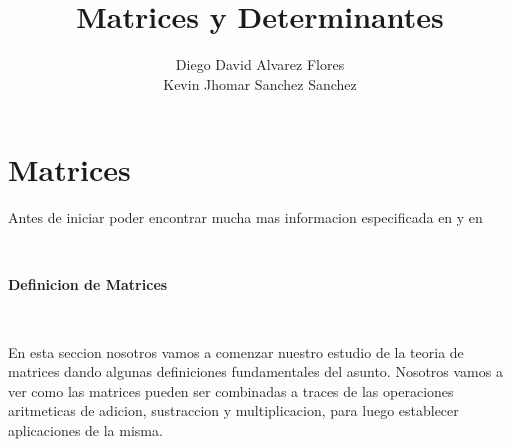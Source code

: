 \documentclass[11pt, conference]{IEEEtran}
\begin{document}
\title{\bf Matrices y Determinantes}
\author{Diego David Alvarez Flores \\
Kevin Jhomar Sanchez Sanchez \\}
\maketitle

\pagebreak 

\tableofcontents 

\pagebreak
\section{Matrices}
Antes de iniciar poder encontrar mucha mas informacion especificada en y en 

\
\

\textbf{Definicion de Matrices}

\

En esta seccion nosotros vamos a comenzar nuestro estudio de la teoria de matrices dando algunas definiciones fundamentales del asunto. Nosotros vamos a ver como las matrices pueden ser combinadas a traces de las operaciones aritmeticas de adicion, sustraccion y multiplicacion, para luego establecer aplicaciones de la misma.

\
\end{document}
